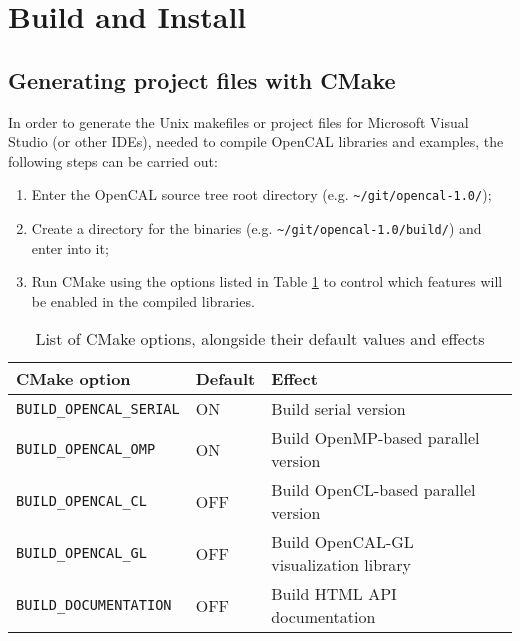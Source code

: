 \section{Build and Install}

\subsection{Generating project files with CMake}

In order to generate the Unix makefiles or project files for Microsoft
Visual Studio (or other IDEs), needed to compile OpenCAL libraries and
examples, the following steps can be carried out:

\begin{enumerate}
\item Enter the OpenCAL source tree root directory (e.g. \verb'~/git/opencal-1.0/');
\item Create a directory for the binaries
  (e.g. \verb'~/git/opencal-1.0/build/') and enter into it;
\item Run CMake using the options listed in Table
  \ref{ch:installation:cmakeoptions} to control which features will be
  enabled in the compiled libraries.
\end{enumerate}

\begin{table}[h]
  \centering
  \caption{List of CMake options, alongside their default values and
    effects}
  \label{ch:installation:cmakeoptions}
  \begin{tabular}{lll}
    \hline
    CMake option &  Default & Effect\\
    \hline
    \texttt{BUILD\_OPENCAL\_SERIAL} & ON  & Build serial version\\
    \texttt{BUILD\_OPENCAL\_OMP}    & ON  & Build OpenMP-based parallel version\\
    \texttt{BUILD\_OPENCAL\_CL}     & OFF & Build OpenCL-based parallel version\\
    \texttt{BUILD\_OPENCAL\_GL}     & OFF & Build OpenCAL-GL visualization library\\
    \texttt{BUILD\_DOCUMENTATION}   & OFF & Build HTML API documentation\\
     \hline
  \end{tabular}
\end{table}

